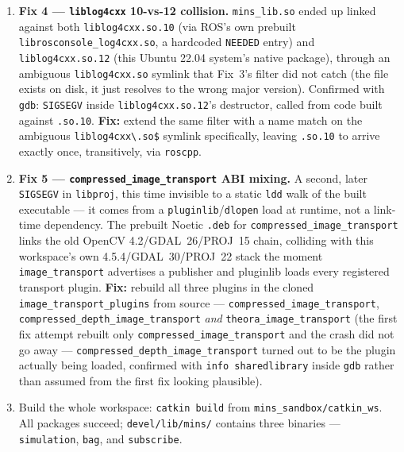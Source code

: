 \documentclass[11pt]{report}
\begin{document}
\begin{enumerate}
  \item \textbf{Fix 4 --- \texttt{liblog4cxx} 10-vs-12 collision.}
  \texttt{mins\_lib.so} ended up linked against both
  \texttt{liblog4cxx.so.10} (via ROS's own prebuilt
  \texttt{librosconsole\_log4cxx.so}, a hardcoded \texttt{NEEDED} entry) and
  \texttt{liblog4cxx.so.12} (this Ubuntu 22.04 system's native package),
  through an ambiguous \texttt{liblog4cxx.so} symlink that Fix~3's filter did
  not catch (the file exists on disk, it just resolves to the wrong major
  version). Confirmed with \texttt{gdb}: \texttt{SIGSEGV} inside
  \texttt{liblog4cxx.so.12}'s destructor, called from code built against
  \texttt{.so.10}. \textbf{Fix:} extend the same filter with a name match on
  the ambiguous \texttt{liblog4cxx\textbackslash.so\$} symlink specifically,
  leaving \texttt{.so.10} to arrive exactly once, transitively, via
  \texttt{roscpp}.

  \item \textbf{Fix 5 --- \texttt{compressed\_image\_transport} ABI
  mixing.} A second, later \texttt{SIGSEGV} in \texttt{libproj}, this
  time invisible to a static \texttt{ldd} walk of the built executable ---
  it comes from a \texttt{pluginlib}/\texttt{dlopen} load at runtime, not a
  link-time dependency. The prebuilt Noetic \texttt{.deb} for
  \texttt{compressed\_image\_transport} links the old OpenCV
  4.2/GDAL~26/PROJ~15 chain, colliding with this workspace's own
  4.5.4/GDAL~30/PROJ~22 stack the moment \texttt{image\_transport} advertises
  a publisher and pluginlib loads every registered transport plugin.
  \textbf{Fix:} rebuild all three plugins in the cloned
  \texttt{image\_transport\_plugins} from source ---
  \texttt{compressed\_image\_transport},
  \texttt{compressed\_depth\_image\_transport} \emph{and}
  \texttt{theora\_image\_transport} (the first fix attempt rebuilt only
  \texttt{compressed\_image\_transport} and the crash did not go away ---
  \texttt{compressed\_depth\_image\_transport} turned out to be the plugin
  actually being loaded, confirmed with \texttt{info sharedlibrary} inside
  \texttt{gdb} rather than assumed from the first fix looking plausible).

  \item Build the whole workspace: \texttt{catkin build} from
  \texttt{mins\_sandbox/catkin\_ws}. All packages succeed; \texttt{devel/lib/mins/}
  contains three binaries --- \texttt{simulation}, \texttt{bag}, and
  \texttt{subscribe}.
\end{enumerate}
\endgroup
\end{document}
